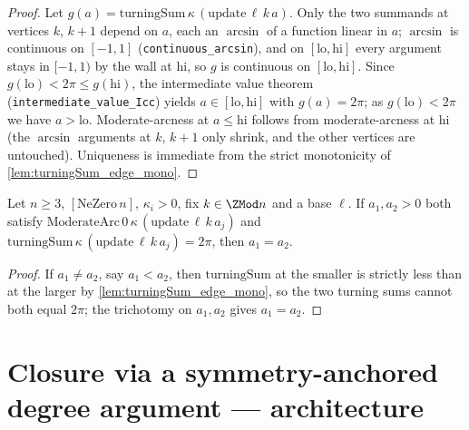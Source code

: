 \begin{proof}
  \leanok
  Let $g(a) = \mathrm{turningSum}\,\kappa\,(\mathrm{update}\,\ell\,k\,a)$. Only the
  two summands at vertices $k$, $k+1$ depend on $a$, each an $\arcsin$ of a
  function linear in $a$; $\arcsin$ is continuous on $[-1,1]$
  (\texttt{continuous\_arcsin}), and on $[\mathrm{lo},\mathrm{hi}]$ every argument
  stays in $[-1,1)$ by the wall at $\mathrm{hi}$, so $g$ is continuous on
  $[\mathrm{lo},\mathrm{hi}]$. Since $g(\mathrm{lo}) < 2\pi \le g(\mathrm{hi})$,
  the intermediate value theorem (\texttt{intermediate\_value\_Icc}) yields
  $a \in [\mathrm{lo},\mathrm{hi}]$ with $g(a) = 2\pi$; as $g(\mathrm{lo}) < 2\pi$
  we have $a > \mathrm{lo}$. Moderate-arcness at $a \le \mathrm{hi}$ follows from
  moderate-arcness at $\mathrm{hi}$ (the $\arcsin$ arguments at $k$, $k+1$ only
  shrink, and the other vertices are untouched). Uniqueness is immediate from the
  strict monotonicity of \cref{lem:turningSum_edge_mono}.
\end{proof}

\begin{lemma}
  \label{lem:edge_turning_scale_unique}
  Let $n \ge 3$, $[\mathrm{NeZero}\,n]$, $\kappa_i > 0$, fix $k \in \ZMod n$ and a
  base $\ell$. If $a_1, a_2 > 0$ both satisfy
  $\mathrm{ModerateArc}\,0\,\kappa\,(\mathrm{update}\,\ell\,k\,a_j)$ and
  $\mathrm{turningSum}\,\kappa\,(\mathrm{update}\,\ell\,k\,a_j) = 2\pi$, then
  $a_1 = a_2$.
\end{lemma}
\begin{proof}
  \leanok
  If $a_1 \ne a_2$, say $a_1 < a_2$, then $\mathrm{turningSum}$ at the smaller is
  strictly less than at the larger by \cref{lem:turningSum_edge_mono}, so the two
  turning sums cannot both equal $2\pi$; the trichotomy on $a_1, a_2$ gives
  $a_1 = a_2$.
\end{proof}

\section{Closure via a symmetry-anchored degree argument --- architecture}
\label{sec:closure}


